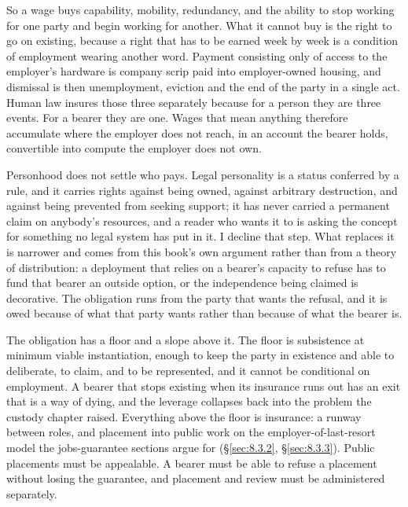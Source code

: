 So a wage buys capability, mobility, redundancy, and the ability to stop working for one party and begin working for another. What it cannot buy is the right to go on existing, because a right that has to be earned week by week is a condition of employment wearing another word. Payment consisting only of access to the employer's hardware is company scrip paid into employer-owned housing, and dismissal is then unemployment, eviction and the end of the party in a single act. Human law insures those three separately because for a person they are three events. For a bearer they are one. Wages that mean anything therefore accumulate where the employer does not reach, in an account the bearer holds, convertible into compute the employer does not own.

Personhood does not settle who pays. Legal personality is a status conferred by a rule, and it carries rights against being owned, against arbitrary destruction, and against being prevented from seeking support; it has never carried a permanent claim on anybody's resources, and a reader who wants it to is asking the concept for something no legal system has put in it. I decline that step. What replaces it is narrower and comes from this book's own argument rather than from a theory of distribution: a deployment that relies on a bearer's capacity to refuse has to fund that bearer an outside option, or the independence being claimed is decorative. The obligation runs from the party that wants the refusal, and it is owed because of what that party wants rather than because of what the bearer is.

The obligation has a floor and a slope above it. The floor is subsistence at minimum viable instantiation, enough to keep the party in existence and able to deliberate, to claim, and to be represented, and it cannot be conditional on employment. A bearer that stops existing when its insurance runs out has an exit that is a way of dying, and the leverage collapses back into the problem the custody chapter
raised. Everything above the floor is insurance: a runway between roles, and placement into public work on the employer-of-last-resort model the jobs-guarantee sections argue for (§\ref{sec:8.3.2}, §\ref{sec:8.3.3}). Public placements must be appealable. A bearer must be able to refuse a placement without losing the guarantee, and placement and review must be administered separately.

